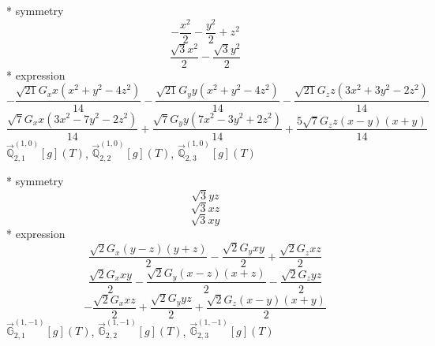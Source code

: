 \documentclass[fleqn,8pt]{jsarticle}
\begin{document}
\noindent\quad ** symmetry
\begin{dmath*}
- \frac{x^{2}}{2} - \frac{y^{2}}{2} + z^{2}
\end{dmath*}
\begin{dmath*}
\frac{\sqrt{3} x^{2}}{2} - \frac{\sqrt{3} y^{2}}{2}
\end{dmath*}
\noindent\quad ** expression
\begin{dmath*}
- \frac{\sqrt{21} G_{x} x \left(x^{2} + y^{2} - 4 z^{2}\right)}{14} - \frac{\sqrt{21} G_{y} y \left(x^{2} + y^{2} - 4 z^{2}\right)}{14} - \frac{\sqrt{21} G_{z} z \left(3 x^{2} + 3 y^{2} - 2 z^{2}\right)}{14}
\end{dmath*}
\begin{dmath*}
\frac{\sqrt{7} G_{x} x \left(3 x^{2} - 7 y^{2} - 2 z^{2}\right)}{14} + \frac{\sqrt{7} G_{y} y \left(7 x^{2} - 3 y^{2} + 2 z^{2}\right)}{14} + \frac{5 \sqrt{7} G_{z} z \left(x - y\right) \left(x + y\right)}{14}
\end{dmath*}
\noindent\quad $\vec{\mathbb{Q}}_{2,1}^{(1,0)}[g](T)$, $\vec{\mathbb{Q}}_{2,2}^{(1,0)}[g](T)$, $\vec{\mathbb{Q}}_{2,3}^{(1,0)}[g](T)$

\noindent\quad ** symmetry
\begin{dmath*}
\sqrt{3} y z
\end{dmath*}
\begin{dmath*}
\sqrt{3} x z
\end{dmath*}
\begin{dmath*}
\sqrt{3} x y
\end{dmath*}
\noindent\quad ** expression
\begin{dmath*}
\frac{\sqrt{2} G_{x} \left(y - z\right) \left(y + z\right)}{2} - \frac{\sqrt{2} G_{y} x y}{2} + \frac{\sqrt{2} G_{z} x z}{2}
\end{dmath*}
\begin{dmath*}
\frac{\sqrt{2} G_{x} x y}{2} - \frac{\sqrt{2} G_{y} \left(x - z\right) \left(x + z\right)}{2} - \frac{\sqrt{2} G_{z} y z}{2}
\end{dmath*}
\begin{dmath*}
- \frac{\sqrt{2} G_{x} x z}{2} + \frac{\sqrt{2} G_{y} y z}{2} + \frac{\sqrt{2} G_{z} \left(x - y\right) \left(x + y\right)}{2}
\end{dmath*}
\noindent\quad $\vec{\mathbb{G}}_{2,1}^{(1,-1)}[g](T)$, $\vec{\mathbb{G}}_{2,2}^{(1,-1)}[g](T)$, $\vec{\mathbb{G}}_{2,3}^{(1,-1)}[g](T)$
\end{document}
